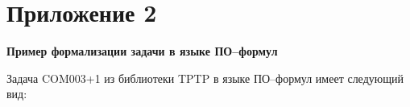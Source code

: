 \chapter*{Приложение 2}

\vspace{5cm}

\begin{center}
\textbf{\LARGE{Пример формализации задачи в языке ПО--формул}}
\end{center}

\newpage



Задача COM003+1 из библиотеки TPTP в языке ПО--формул имеет следующий вид:

